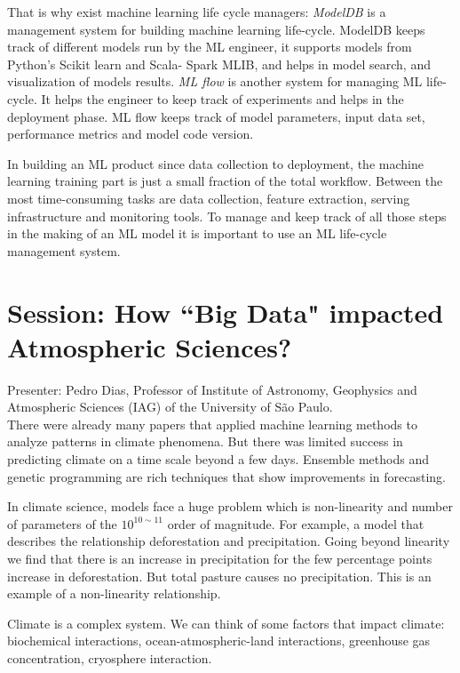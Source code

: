 \documentclass[9pt,a4paper]{article}
\begin{document}
That is why exist machine learning life cycle managers:  
\textit{ModelDB} is a management system for building machine learning life-cycle. ModelDB keeps track of different models run by the ML engineer, it supports models from Python's Scikit learn and Scala- Spark MLIB, and helps in model search, and visualization of models results.
\textit{ML flow} is another system for managing ML life-cycle. It helps the engineer to keep track of experiments and helps in the deployment phase. ML flow keeps track of model parameters, input data set, performance metrics and model code version.
 
In building an ML product since data collection to deployment, the machine learning training part is just a small fraction of the total workflow. Between the most time-consuming tasks are data collection, feature extraction, serving infrastructure and monitoring tools. To manage and keep track of all those steps in the making of an ML model it is important to use an ML life-cycle management system. 


\section*{Session: How  ``Big Data" impacted  Atmospheric  Sciences?}

Presenter: Pedro Dias, Professor of Institute of Astronomy, Geophysics and Atmospheric Sciences (IAG) of the University of São Paulo.\\

There were already many papers that applied machine learning methods to analyze patterns in climate phenomena. 
But there was limited success in predicting climate on a time scale beyond a few days.
Ensemble methods and genetic programming are rich techniques that show improvements in forecasting.

In climate science, models face a huge problem which is non-linearity and number of parameters of the $10^{10 \sim 11}$ order of magnitude.
For example, a model that describes the relationship deforestation and precipitation. 
Going beyond linearity we find that there is an increase in precipitation for the few percentage points increase in deforestation. 
But total pasture causes no precipitation. This is an example of a non-linearity relationship.

Climate is a complex system. We can think of some factors that impact climate: biochemical interactions, ocean-atmospheric-land interactions, greenhouse gas concentration, cryosphere interaction. 
\end{document}

